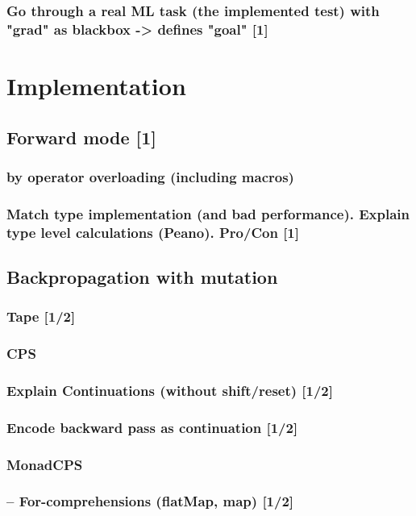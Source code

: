 \documentclass[
	english,
	class=report,custommargins=true,marginpar=false,
	accentcolor=9c,%
	thesis={type=bachelor},%
	fontsize=11pt,%
]{tudapub}
\begin{document}
\subsection{Go through a real ML task (the implemented test) with "grad" as blackbox -> defines "goal" [1]}
% 

\chapter{Implementation}
\section{Forward mode [1]}
\subsection{by operator overloading (including macros)}
\subsection{Match type implementation (and bad performance). Explain type level calculations (Peano). Pro/Con [1]}

\section{Backpropagation with mutation}
\subsection{Tape [1/2]} %
\subsection{CPS}
\subsection{Explain Continuations (without shift/reset) [1/2]}
\subsection{Encode backward pass as continuation [1/2]}
\subsection{MonadCPS}
\subsection{ -- For-comprehensions (flatMap, map) [1/2]}
\end{document}

